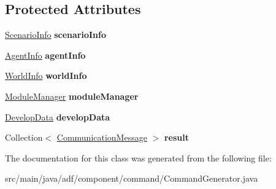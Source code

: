 \subsection*{Protected Attributes}
\begin{DoxyCompactItemize}
\item 
\hypertarget{classadf_1_1component_1_1command_1_1CommandGenerator_a543633658836fd35a1a84863a6590db1}{}\label{classadf_1_1component_1_1command_1_1CommandGenerator_a543633658836fd35a1a84863a6590db1} 
\hyperlink{classadf_1_1agent_1_1info_1_1ScenarioInfo}{Scenario\+Info} {\bfseries scenario\+Info}
\item 
\hypertarget{classadf_1_1component_1_1command_1_1CommandGenerator_a8d7f44b456637032255eacd51e8cfc27}{}\label{classadf_1_1component_1_1command_1_1CommandGenerator_a8d7f44b456637032255eacd51e8cfc27} 
\hyperlink{classadf_1_1agent_1_1info_1_1AgentInfo}{Agent\+Info} {\bfseries agent\+Info}
\item 
\hypertarget{classadf_1_1component_1_1command_1_1CommandGenerator_ac0f8b8c16c071a23223d7485cd188c97}{}\label{classadf_1_1component_1_1command_1_1CommandGenerator_ac0f8b8c16c071a23223d7485cd188c97} 
\hyperlink{classadf_1_1agent_1_1info_1_1WorldInfo}{World\+Info} {\bfseries world\+Info}
\item 
\hypertarget{classadf_1_1component_1_1command_1_1CommandGenerator_ab10faeffe7d6547cf5d27726c64a699d}{}\label{classadf_1_1component_1_1command_1_1CommandGenerator_ab10faeffe7d6547cf5d27726c64a699d} 
\hyperlink{classadf_1_1agent_1_1module_1_1ModuleManager}{Module\+Manager} {\bfseries module\+Manager}
\item 
\hypertarget{classadf_1_1component_1_1command_1_1CommandGenerator_adce137b57368269f73e5259b0f844279}{}\label{classadf_1_1component_1_1command_1_1CommandGenerator_adce137b57368269f73e5259b0f844279} 
\hyperlink{classadf_1_1agent_1_1develop_1_1DevelopData}{Develop\+Data} {\bfseries develop\+Data}
\item 
\hypertarget{classadf_1_1component_1_1command_1_1CommandGenerator_a60302b470fa7607d888d5545ea17d311}{}\label{classadf_1_1component_1_1command_1_1CommandGenerator_a60302b470fa7607d888d5545ea17d311} 
Collection$<$ \hyperlink{classadf_1_1component_1_1communication_1_1CommunicationMessage}{Communication\+Message} $>$ {\bfseries result}
\end{DoxyCompactItemize}


The documentation for this class was generated from the following file\+:\begin{DoxyCompactItemize}
\item 
src/main/java/adf/component/command/Command\+Generator.\+java\end{DoxyCompactItemize}
